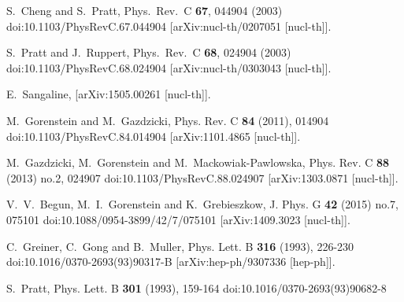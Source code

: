 \documentclass[aps,prc,nofootinbib,showpacs,superscriptaddress,groupedaddress]{revtex4-1}
\begin{document}
\begin{thebibliography}{99}
S.~Cheng and S.~Pratt,
Phys.\ Rev.\ C \textbf{67}, 044904 (2003)
doi:10.1103/PhysRevC.67.044904
[arXiv:nucl-th/0207051 [nucl-th]].

S.~Pratt and J.~Ruppert,
Phys.\ Rev.\ C \textbf{68}, 024904 (2003)
doi:10.1103/PhysRevC.68.024904
[arXiv:nucl-th/0303043 [nucl-th]].

E.~Sangaline,
[arXiv:1505.00261 [nucl-th]].

M.~Gorenstein and M.~Gazdzicki,
Phys. Rev. C \textbf{84} (2011), 014904
doi:10.1103/PhysRevC.84.014904
[arXiv:1101.4865 [nucl-th]].

M.~Gazdzicki, M.~Gorenstein and M.~Mackowiak-Pawlowska,
Phys. Rev. C \textbf{88} (2013) no.2, 024907
doi:10.1103/PhysRevC.88.024907
[arXiv:1303.0871 [nucl-th]].

V.~V.~Begun, M.~I.~Gorenstein and K.~Grebieszkow,
J. Phys. G \textbf{42} (2015) no.7, 075101
doi:10.1088/0954-3899/42/7/075101
[arXiv:1409.3023 [nucl-th]].

C.~Greiner, C.~Gong and B.~Muller,
Phys. Lett. B \textbf{316} (1993), 226-230
doi:10.1016/0370-2693(93)90317-B
[arXiv:hep-ph/9307336 [hep-ph]].

S.~Pratt,
Phys. Lett. B \textbf{301} (1993), 159-164
doi:10.1016/0370-2693(93)90682-8


\end{thebibliography}
\end{document}
